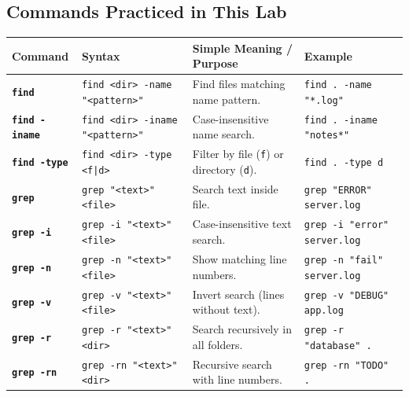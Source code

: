 \documentclass[10pt,a4paper]{article}
\newcommand{\cmd}[1]{\texttt{\textbf{#1}}}
\begin{document}
\subsection{Commands Practiced in This Lab}
\vspace{-2pt}
\begin{table}[h!]
\centering\footnotesize
\renewcommand{\arraystretch}{1.06}
\begin{tabularx}{\linewidth}{llp{5.4cm}X}
\toprule
\textbf{Command} & \textbf{Syntax} & \textbf{Simple Meaning / Purpose} & \textbf{Example} \\
\midrule
\cmd{find} & \texttt{find <dir> -name "<pattern>"} & Find files matching name pattern. & \texttt{find . -name "*.log"} \\
\cmd{find -iname} & \texttt{find <dir> -iname "<pattern>"} & Case-insensitive name search. & \texttt{find . -iname "notes*"} \\
\cmd{find -type} & \texttt{find <dir> -type <f|d>} & Filter by file (\texttt{f}) or directory (\texttt{d}). & \texttt{find . -type d} \\
\cmd{grep} & \texttt{grep "<text>" <file>} & Search text inside file. & \texttt{grep "ERROR" server.log} \\
\cmd{grep -i} & \texttt{grep -i "<text>" <file>} & Case-insensitive text search. & \texttt{grep -i "error" server.log} \\
\cmd{grep -n} & \texttt{grep -n "<text>" <file>} & Show matching line numbers. & \texttt{grep -n "fail" server.log} \\
\cmd{grep -v} & \texttt{grep -v "<text>" <file>} & Invert search (lines without text). & \texttt{grep -v "DEBUG" app.log} \\
\cmd{grep -r} & \texttt{grep -r "<text>" <dir>} & Search recursively in all folders. & \texttt{grep -r "database" .} \\
\cmd{grep -rn} & \texttt{grep -rn "<text>" <dir>} & Recursive search with line numbers. & \texttt{grep -rn "TODO" .} \\
\bottomrule
\end{tabularx}
\end{table}
\vspace{-6pt}
\end{document}
